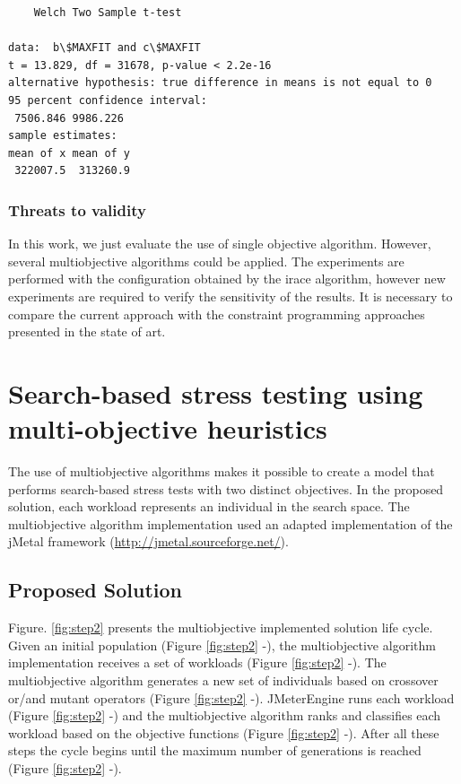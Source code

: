 \documentclass{report}
\begin{document}
\begin{lstlisting}
	Welch Two Sample t-test

data:  b\$MAXFIT and c\$MAXFIT
t = 13.829, df = 31678, p-value < 2.2e-16
alternative hypothesis: true difference in means is not equal to 0
95 percent confidence interval:
 7506.846 9986.226
sample estimates:
mean of x mean of y 
 322007.5  313260.9 

\end{lstlisting}



\subsection{Threats to validity}

In this work, we just evaluate the use of single objective algorithm. However, several multiobjective algorithms could be applied.  The experiments are performed with the configuration obtained by the irace algorithm, however new experiments are required to verify the sensitivity of the results. It is necessary to compare the current approach with the constraint programming approaches presented in the state of art.

\FloatBarrier

\chapter{Search-based stress testing using multi-objective heuristics}

The use of multiobjective algorithms makes it possible to create a model that performs search-based stress tests with  two distinct objectives. In the proposed solution, each workload represents an individual in the search space. The multiobjective algorithm implementation used an adapted implementation of the jMetal framework (\url{http://jmetal.sourceforge.net/}).


\section{Proposed Solution} 

Figure. \ref{fig:step2} presents the multiobjective implemented solution life cycle. Given an initial population (Figure \ref{fig:step2}  -),  the multiobjective algorithm implementation receives a set of workloads  (Figure \ref{fig:step2}  -). The multiobjective algorithm generates a new set of individuals based on crossover or/and mutant operators (Figure \ref{fig:step2}  -).  JMeterEngine runs each workload (Figure \ref{fig:step2}  -) and the multiobjective algorithm ranks and classifies each workload based on the objective functions  (Figure \ref{fig:step2}  -).  After all these steps the cycle begins until the maximum number of generations is reached (Figure \ref{fig:step2}  -). 
\end{document}
